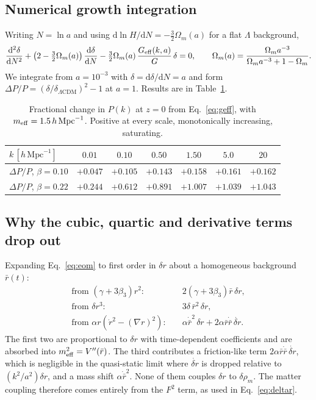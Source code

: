 \documentclass[11pt,a4paper]{article}
\newcommand{\hMpc}{h\,\mathrm{Mpc}^{-1}}
\newcommand{\LCDM}{\Lambda\mathrm{CDM}}
\newcommand{\Geff}{G_{\rm eff}}
\newcommand{\meff}{m_{\rm eff}}
\begin{document}
\subsection{Numerical growth integration}

Writing $N=\ln a$ and using $\mathrm{d}\ln H/\mathrm{d}N=-\tfrac32\Omega_m(a)$ for a
flat $\Lambda$ background,
\begin{equation}
\frac{\mathrm{d}^2\delta}{\mathrm{d}N^2}
+\left(2-\tfrac32\Omega_m(a)\right)\frac{\mathrm{d}\delta}{\mathrm{d}N}
-\tfrac32\Omega_m(a)\,\frac{\Geff(k,a)}{G}\,\delta = 0,
\qquad
\Omega_m(a)=\frac{\Omega_m a^{-3}}{\Omega_m a^{-3}+1-\Omega_m}.
\end{equation}
We integrate from $a=10^{-3}$ with $\delta=\mathrm{d}\delta/\mathrm{d}N=a$ and form
$\Delta P/P=(\delta/\delta_{\LCDM})^2-1$ at $a=1$. Results are in
Table~\ref{tab:growth}.

\begin{table}[htb]
\centering
\small
\begin{tabular}{lcccccc}
\toprule
$k\,[\hMpc]$ & $0.01$ & $0.10$ & $0.50$ & $1.50$ & $5.0$ & $20$\\
\midrule
$\Delta P/P$, $\beta=0.10$ & $+0.047$ & $+0.105$ & $+0.143$ & $+0.158$ & $+0.161$ & $+0.162$\\
$\Delta P/P$, $\beta=0.22$ & $+0.244$ & $+0.612$ & $+0.891$ & $+1.007$ & $+1.039$ & $+1.043$\\
\bottomrule
\end{tabular}
\caption{Fractional change in $P(k)$ at $z=0$ from Eq.~\eqref{eq:geff}, with
$\meff=1.5\,\hMpc$. Positive at every scale, monotonically increasing, saturating.}
\label{tab:growth}
\end{table}

\subsection{Why the cubic, quartic and derivative terms drop out}

Expanding Eq.~\eqref{eq:eom} to first order in $\delta r$ about a homogeneous
background $\bar r(t)$:
\begin{align}
\text{from } (\gamma+3\beta_3)r^2 :&\quad 2(\gamma+3\beta_3)\bar r\,\delta r,\\
\text{from } \delta r^3 :&\quad 3\delta\,\bar r^2\,\delta r,\\
\text{from } \alpha r(\dot r^2-(\nabla r)^2) :&\quad
\alpha\dot{\bar r}^2\,\delta r + 2\alpha\bar r\dot{\bar r}\,\dot{\delta r}.
\end{align}
The first two are proportional to $\delta r$ with time-dependent coefficients and are
absorbed into $\meff^2=V''(\bar r)$. The third contributes a friction-like term
$2\alpha\bar r\dot{\bar r}\,\dot{\delta r}$, which is negligible in the quasi-static
limit where $\dot{\delta r}$ is dropped relative to $(k^2/a^2)\delta r$, and a mass
shift $\alpha\dot{\bar r}^2$. None of them couples $\delta r$ to $\delta\rho_m$.
The matter coupling therefore comes entirely from the $F^2$ term, as used in
Eq.~\eqref{eq:deltar}.
\end{document}
